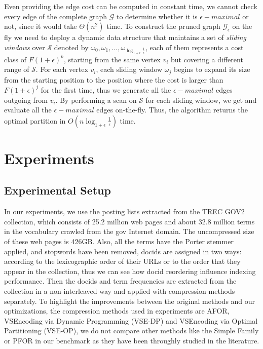 \documentclass[runningheads,a4paper]{llncs}
\begin{document}
Even providing the edge cost can be computed in constant time, we cannot check every edge of the complete graph $\mathcal{G}$ to determine whether it is $\epsilon-maximal$ or not, since it would take $\Theta\left(n^{2}\right)$ time. To construct the pruned graph $\mathcal{G}_{\epsilon}$ on the fly we need to deploy a dynamic data structure that maintains a set of \textit{sliding windows} over $\mathcal{S}$ denoted by $\omega_{0},\omega_{1},\dots, \omega_{\log_{1+\epsilon}\frac{1}{\epsilon}}$, each of them represents a cost class of $F\left(1+\epsilon\right)^{k}$,  starting from the same vertex $v_{i}$ but covering a different range of $\mathcal{S}$. For each vertex $v_{i}$, each sliding window $\omega_{j}$ begins to expand its size from the starting position to the position where the cost is larger than $F\left(1+\epsilon\right)^{j}$ for the first time, thus we generate all the $\epsilon-maximal$ edges outgoing from $v_{i}$. By performing a scan on $\mathcal{S}$ for each sliding window, we get and evaluate all the $\epsilon-maximal$ edges on-the-fly. Thus, the algorithm returns the optimal partition in $O\left(n\log_{1+\epsilon}\frac{1}{\epsilon}\right)$ time.

\section{Experiments}\label{sec:experiments}

\subsection{Experimental Setup}

In our experiments, we use the posting lists extracted from the TREC GOV2 collection, which consists of 25.2 million web pages and about 32.8 million terms in the vocabulary crawled from the gov Internet domain. The uncompressed size of these web pages is 426GB. Also, all the terms have the Porter stemmer applied, and stopwords have been removed, docids are assigned in two ways: according to the lexicographic order of their URLs or to the order that they appear in the collection, thus we can see how docid reordering influence indexing performance. Then the docids and term frequencies are extracted from the collection in a non-interleaved way and applied with compression methods separately. To highlight the improvements between the original methods and our optimizations, the compression methods used in experiments are AFOR, VSEncoding via Dynamic Programming (VSE-DP) and VSEncoding via Optimal Partitioning (VSE-OP), we do not compare other methods like the Simple Family or PFOR in our benchmark as they have been throughly studied in the literature\cite{catena2014inverted,lemire2015decoding,ottaviano2015optimal,yan2009inverted}.
\end{document}
